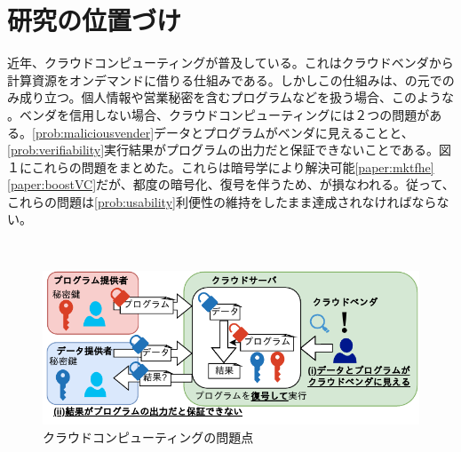 
\section{研究の位置づけ}


近年、クラウドコンピューティングが普及している。これはクラウドベンダから計算資源をオンデマンドに借りる仕組みである。しかしこの仕組みは、の元でのみ成り立つ。個人情報や営業秘密を含むプログラムなどを扱う場合、このような 。ベンダを信用しない場合、クラウドコンピューティングには２つの問題がある。\ref{prob:maliciousvender}データとプログラムがベンダに見えることと、\ref{prob:verifiability}実行結果がプログラムの出力だと保証できないことである。図１にこれらの問題をまとめた。これらは暗号学により解決可能\ref{paper:mktfhe}\ref{paper:boostVC}だが、都度の暗号化、復号を伴うため、が損なわれる。従って、これらの問題は\ref{prob:usability}利便性の維持をしたまま達成されなければならない。

　
\begin{figure}[h]
    \centering
    \includegraphics[width=0.8\linewidth]{figures/problem.drawio.pdf}
    \vspace*{-0.5cm}
    \caption{クラウドコンピューティングの問題点}
    \label{fig:my_label}
\end{figure}

